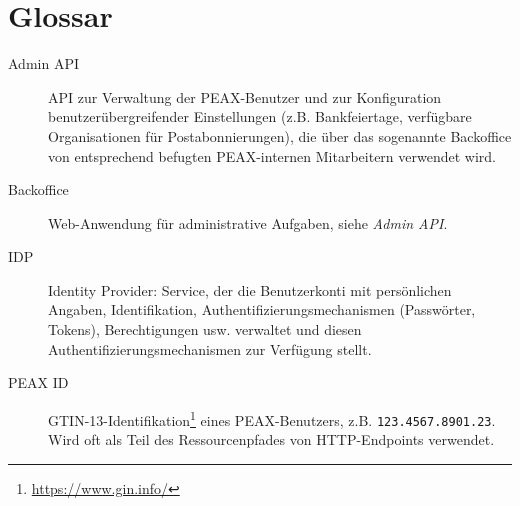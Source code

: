 \section*{Glossar}

\begin{description}
    \item[Admin API] API zur Verwaltung der PEAX-Benutzer und zur Konfiguration benutzerübergreifender Einstellungen (z.B. Bankfeiertage, verfügbare Organisationen für Postabonnierungen), die über das sogenannte Backoffice von entsprechend befugten PEAX-internen Mitarbeitern verwendet wird.
    \item[Backoffice] Web-Anwendung für administrative Aufgaben, siehe \textit{Admin API}.
    \item[IDP] Identity Provider: Service, der die Benutzerkonti mit persönlichen Angaben, Identifikation, Authentifizierungsmechanismen (Passwörter, Tokens), Berechtigungen usw. verwaltet und diesen Authentifizierungsmechanismen zur Verfügung stellt.
    \item[PEAX ID] GTIN-13-Identifikation\footnote{\url{https://www.gin.info/}} eines PEAX-Benutzers, z.B. \texttt{123.4567.8901.23}. Wird oft als Teil des Ressourcenpfades von HTTP-Endpoints verwendet.
\end{description}
